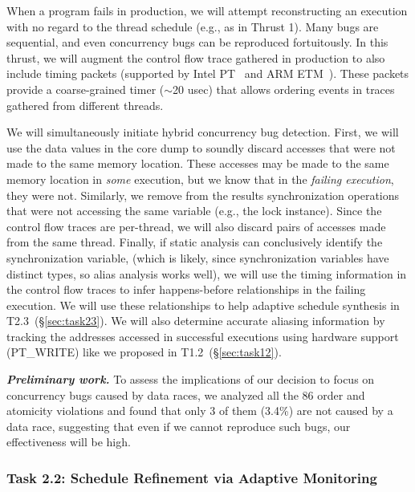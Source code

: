 When a program fails in production, we will attempt reconstructing an execution with no regard to the thread schedule (e.g., as in Thrust 1). Many bugs are sequential, and even concurrency bugs can be reproduced fortuitously. In this thrust, we will augment the control flow trace gathered in production to also include timing packets (supported by Intel PT~\cite{intelpt} and ARM ETM~\cite{armetm}). These packets provide a coarse-grained timer ($\sim$20 usec) that allows ordering events in traces gathered from different threads.


We will simultaneously initiate hybrid concurrency bug detection. First, we will use the data values in the core dump to soundly discard accesses that were not made to the same memory location. These accesses may be made to the same memory location in \textit{some} execution, but we know that in the \textit{failing execution}, they were not. Similarly, we remove from the results synchronization operations that were not accessing the same variable (e.g., the lock instance). Since the control flow traces are per-thread, we will also discard pairs of accesses made from the same thread. Finally, if static analysis can conclusively identify the synchronization variable, (which is likely, since synchronization variables have distinct types, so alias analysis works well), we will use the timing information in the control flow traces to infer happens-before relationships in the failing execution. We will use these relationships to help adaptive schedule synthesis in T2.3~(\S\ref{sec:task23}). We will also determine accurate aliasing information by tracking the addresses accessed in successful executions using hardware support (PT\_WRITE) like we proposed in T1.2~(\S\ref{sec:task12}).

\noindent \textit{\textbf{Preliminary work.}} To assess the implications of our decision to focus on concurrency bugs caused by data races, we analyzed all the 86 order and atomicity violations and found that only 3 of them (3.4\%) are not caused by a data race, suggesting that even if we cannot reproduce such bugs, our effectiveness will be high. 



\subsubsection{Task 2.2: Schedule Refinement via Adaptive Monitoring} 
\label{sec:task22}


